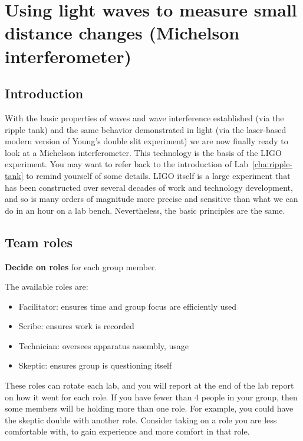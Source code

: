 \chapter{Using light waves to measure small distance changes (Michelson interferometer)}

\section{Introduction}

With the basic properties of waves and wave interference established (via the ripple tank) and the same behavior
demonstrated in light (via the laser-based modern version of Young's double slit experiment) we are now finally ready to
look at a Michelson interferometer. This technology is the basis of the LIGO experiment. You may want to refer back to
the introduction of Lab~\ref{cha:ripple-tank} to remind yourself of some details. LIGO itself is a large experiment that has
been constructed over several decades of work and technology development, and so is many orders of magnitude more
precise and sensitive than what we can do in an hour on a lab bench. Nevertheless, the basic principles are the same.


\section{Team roles}

\begin{steps}
	\item \textbf{Decide on roles} for each group member.
\end{steps}

The available roles are:

\begin{itemize}
	\item Facilitator: ensures time and group focus are efficiently used
	\item Scribe: ensures work is recorded
	\item Technician: oversees apparatus assembly, usage
	\item Skeptic: ensures group is questioning itself
\end{itemize}

These roles can rotate each lab, and you will report at the end of the lab report on how it went for each role. If you have fewer than 4 people in your group, then some members will be holding more than one role. For example, you could have the skeptic double with another role. Consider taking on a role you are less comfortable with, to gain experience and more comfort in that role.

